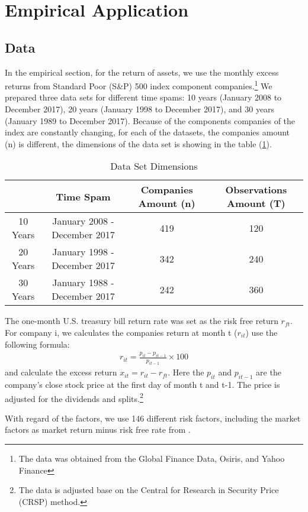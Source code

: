 




%
	\section{Empirical Application}
	\subsection{Data}\label{data}
	
In the empirical section, for the return of assets,  we use the monthly excess returns from Standard Poor (S\&P) 500 index component companies.\footnote{The data was obtained from the Global Finance Data, Osiris, and Yahoo Finance}
We prepared three data sets for different time spams: 10 years (January 2008 to December 2017), 20 years (January 1998 to December 2017), and 30 years (January 1989 to December 2017).
Because of the components companies of the index are constantly changing, for each of the datasets, the companies amount (n) is different, the dimensions of the data set is showing in the table (\ref{Data_set}).


\begin{table}[h]
		\caption{Data Set Dimensions}
			\label{Data_set}
	\begin{tabular}{c|ccc}
		\hline
		& Time Spam                    & Companies Amount (n) & Observations Amount (T) \\ \hline
		10 Years & January 2008 - December 2017 & 419                  & 120                     \\
		20 Years & January 1998 - December 2017 & 342                  & 240                     \\
		30 Years & January 1988 - December 2017 & 242                  & 360                     \\ \hline
	\end{tabular}
\end{table}
The one-month U.S. treasury bill return rate was set as the risk free return $r_{ft}$.
For company i, we calculates the companies return at month t ($r_{it}$) use the following formula:
\begin{align*}
r_{it} = \frac{p_{i t} - p_{i t-1}}{p_{i t-1}}\times 100
\end{align*}
and calculate the excess return $x_{it} = r_{it} - r_{ft}$.
Here the $p_{it}$ and $p_{i t-1}$ are the company's close stock price at the first day of month t and t-1.
The price is adjusted for the dividends and splits.\footnote{The data is adjusted base on the Central for Research in Security Price (CRSP) method.}

With regard of the factors, we use 146 different risk factors, including the market factors as market return minus risk free rate from .



%
%
%